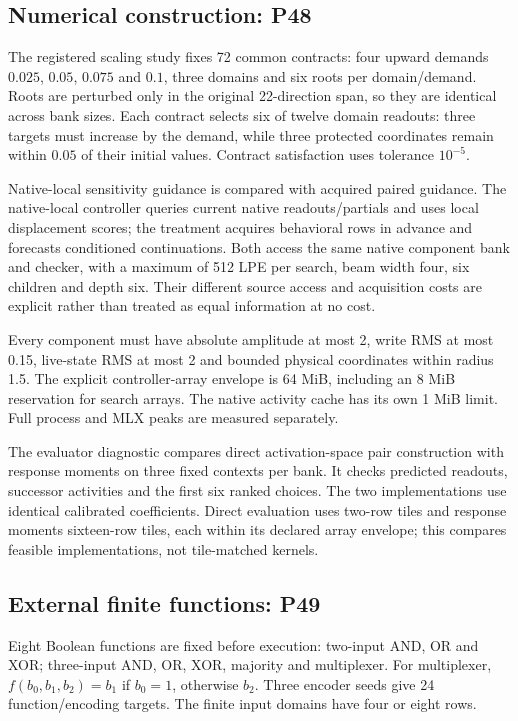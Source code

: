 \documentclass[11pt]{article}
\begin{document}
\subsection{Numerical construction: P48}
The registered scaling study fixes 72 common contracts: four upward demands
$0.025$, $0.05$, $0.075$ and $0.1$, three domains and six roots per domain/demand.
Roots are perturbed only in the original 22-direction span, so they are identical
across bank sizes. Each contract selects six of twelve domain readouts: three
targets must increase by the demand, while three protected coordinates remain
within $0.05$ of their initial values. Contract satisfaction uses tolerance
$10^{-5}$.

Native-local sensitivity guidance is compared with acquired paired guidance.
The native-local controller queries current native readouts/partials and uses
local displacement scores; the treatment acquires behavioral rows in advance
and forecasts conditioned continuations. Both access the same native component
bank and checker, with a maximum of 512 LPE per search, beam width four, six
children and depth six. Their different source access and acquisition costs are
explicit rather than treated as equal information at no cost.

Every component must have absolute amplitude at most 2, write RMS at most 0.15,
live-state RMS at most 2 and bounded physical coordinates within radius 1.5.
The explicit controller-array envelope is 64 MiB, including an 8 MiB reservation
for search arrays. The native activity cache has its own 1 MiB limit. Full
process and MLX peaks are measured separately.

The evaluator diagnostic compares direct activation-space pair construction
with response moments on three fixed contexts per bank. It checks predicted
readouts, successor activities and the first six ranked choices. The two
implementations use identical calibrated coefficients. Direct evaluation uses
two-row tiles and response moments sixteen-row tiles, each within its declared
array envelope; this compares feasible implementations, not tile-matched kernels.

\subsection{External finite functions: P49}
Eight Boolean functions are fixed before execution: two-input AND, OR and XOR;
three-input AND, OR, XOR, majority and multiplexer. For multiplexer,
$f(b_0,b_1,b_2)=b_1$ if $b_0=1$, otherwise $b_2$. Three encoder seeds give 24
function/encoding targets. The finite input domains have four or eight rows.
\end{document}

